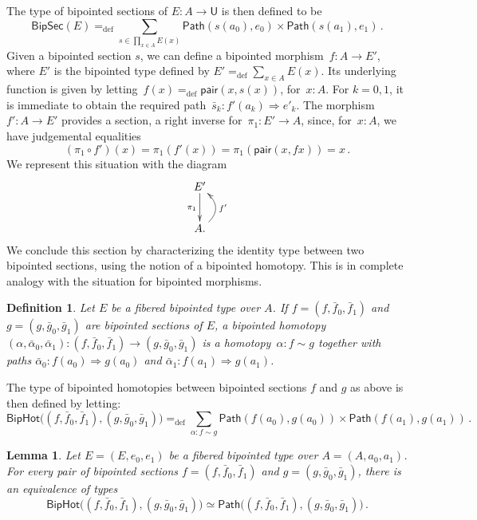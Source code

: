 \documentclass[10pt,a4paper,oneside,reqno]{amsart}
\numberwithin{equation}{section}
\theoremstyle{mythm}
\newtheorem{lemma}[theorem]{Lemma}
\theoremstyle{mydef}
\newtheorem{definition}[theorem]{Definition}
\theoremstyle{myrmk}
\newcommand{\ie}{\text{i.e.\ }}
\newcommand{\deq}{=}
\newcommand{\defeq}{=_{\mathrm{def}}}
\newcommand{\co}{\colon}
\newcommand{\pair}{\mathsf{pair}}
\newcommand{\Id}{\mathsf{Path}}
\newcommand{\UU}{\mathsf{U}}
\newcommand{\BipSec}{\mathsf{BipSec}}
\newcommand{\BipHot}{\mathsf{BipHot}}
\begin{document}
The type of bipointed sections of $E \co A \to \UU$ is then defined to be
\[
\BipSec(E) \defeq \sum_{s \in \prod_{x \in A} E(x)} \Id(s(a_0),  e_0)  \times \Id( s(a_1), e_1)  \, .
\]
Given a bipointed section $s$, we can define a bipointed morphism~$f  \co A \to E'$, where $E'$ is the
bipointed type defined by $E' \defeq \sum_{x \in A} E(x)$. Its underlying function is given by 
letting~$f(x) \defeq \pair(x, s(x))$, for~$x : A$. For $k =  0, 1$, it is 
immediate to obtain the required path~$\bar{s}_k \co f'(a_k) \Rightarrow e'_k$.
The morphism $f' \co A \to E'$ provides a section, \ie a right inverse for~$\pi_1 \co E' \to A$,
 since, for~$x \co A$, we have judgemental equalities
\[
 (\pi_1 \circ f')(x) \deq \pi_1 (f'(x)) \deq \pi_1 (\pair(x, f x)) \deq x \, .
\]
 We represent this situation with the diagram
\[
\xymatrix{
E' \ar[d]_{\pi_1} \\
A . \ar@/_1.2pc/[u]_{f'} }
\]
We conclude this section by characterizing the identity type between two bipointed sections, using
the notion of a bipointed homotopy. This is in complete analogy with the situation for bipointed
morphisms.


\begin{definition} \label{def:2cellsection} Let $E$ be a fibered bipointed type over $A$. If $f = (f, \bar{f}_0,\bar{f}_1)$ and $g = (g, \bar{g}_0, \bar{g}_1)$ are bipointed sections of $E$, a \emph{bipointed homotopy} 
$(\alpha, \bar{\alpha}_0, \bar{\alpha}_1) \co (f, \bar{f}_0, \bar{f}_1)  \rightarrow (g, \bar{g}_0, \bar{g}_1)$ 
is a homotopy~$\alpha \co f \sim g$ together with paths $\bar{\alpha}_0 \co  f(a_0) \Rightarrow  g(a_0)$ and $\bar{\alpha}_1 \co f(a_1) \Rightarrow g(a_1)$. 
\end{definition} 

The type of bipointed homotopies between bipointed sections $f$ and $g$ as above is then defined by letting:
\[
\BipHot \big( (f, \bar{f}_0, \bar{f}_1), (g, \bar{g}_0, \bar{g}_1) \big) \defeq
\sum_{\alpha \co f \sim g} \Id ( f(a_0), g(a_0) ) \times \Id ( f(a_1) , g(a_1) ) \, .
\]


\begin{lemma} \label{thm:biphot}
Let $E = (E, e_0, e_1)$ be a fibered bipointed type over $A = (A, a_0, a_1)$. 
For every pair of bipointed sections $f = (f, \bar{f}_0, \bar{f}_1)$ and $g = (g, \bar{g}_0, \bar{g}_1)$, 
there is an equivalence of types
\[
\BipHot \big( (f, \bar{f}_0, \bar{f}_1), (g, \bar{g}_0, \bar{g}_1) \big)
\simeq 
\Id\big( (f, \bar{f}_0, \bar{f}_1), (g, \bar{g}_0, \bar{g}_1) \big) \, .
\]
\end{lemma}
\end{document}
